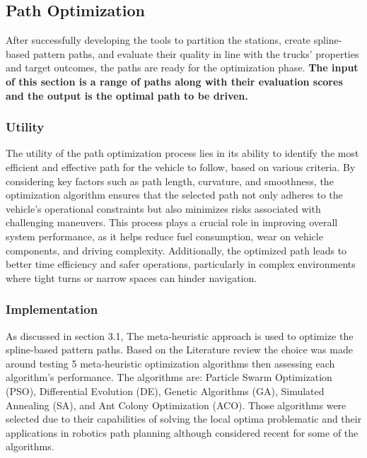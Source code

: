 \subsection{Path Optimization}
After successfully developing the tools to partition the stations, create spline-based pattern paths, and evaluate their quality 
in line with the trucks' properties and target outcomes, the paths are ready for the optimization phase.
\textbf{The input of this section is a range of paths along with their evaluation scores and the output is the optimal 
path to be driven.}

\subsubsection{Utility}
The utility of the path optimization process lies in its ability to identify the most efficient and effective path for the 
vehicle to follow, based on various criteria. By considering key factors such as path length, curvature, and smoothness, 
the optimization algorithm ensures that the selected path not only adheres to the vehicle's operational constraints but 
also minimizes risks associated with challenging maneuvers. This process plays a crucial role in improving overall system 
performance, as it helps reduce fuel consumption, wear on vehicle components, and driving complexity. Additionally, 
the optimized path leads to better time efficiency and safer operations, particularly in complex environments where 
tight turns or narrow spaces can hinder navigation.

\subsubsection{Implementation}
As discussed in section 3.1, The meta-heuristic approach is used to optimize the spline-based pattern paths. 
Based on the Literature review the choice was made around testing 5 meta-heuristic optimization algorithms then 
assessing each algorithm's performance. The algorithms are: Particle Swarm Optimization (PSO), Differential Evolution (DE),
Genetic Algorithms (GA), Simulated Annealing (SA), and Ant Colony Optimization (ACO). Those algorithms were selected due 
to their capabilities of solving the local optima problematic and their applications in robotics path planning although 
considered recent for some of the algorithms. 

